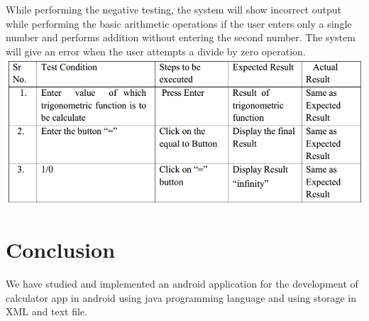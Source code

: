 \documentclass[10pt,a4paper]{article}
\begin{document}
\begin{itemize}
While performing the negative testing, the system will show incorrect output while performing the basic arithmetic operations if the user enters only a single number and performs addition without entering the second number. The system will give an error when the user attempts a divide by zero operation.\\
\includegraphics[width=\textwidth]{trig_positive}


\end{itemize}

\section{Conclusion}
We have studied and implemented an android application for the development of calculator app in android using java programming language and using storage in XML and text file.
\end{document}
